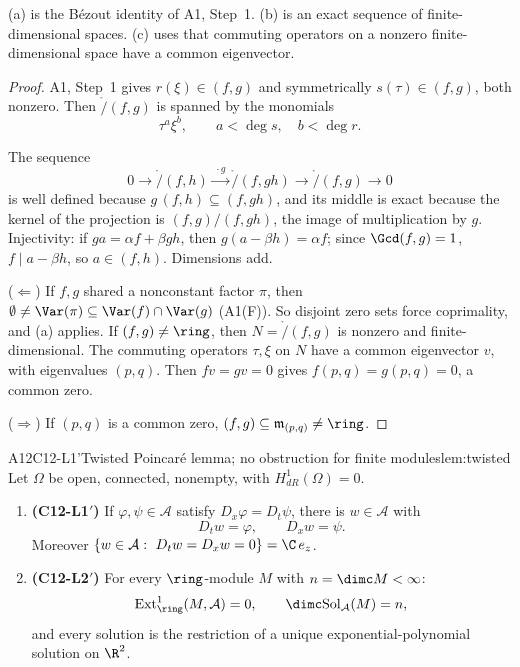 \begin{proofidea}
(a) is the B\'ezout identity of A1, Step~1. (b) is an exact sequence of finite-dimensional spaces. (c) uses that commuting operators on a nonzero finite-dimensional space have a common eigenvector.
\end{proofidea}

\begin{proof}
A1, Step~1 gives $r(\xi)\in(f,g)$ and symmetrically $s(\tau)\in(f,g)$, both nonzero. Then $\ring/(f,g)$ is spanned by the monomials
\[
\tau^a\xi^b,\qquad a<\deg s,\quad b<\deg r .
\]

The sequence
\[
0\to\ring/(f,h)\xrightarrow{\ \cdot g\ }\ring/(f,gh)\to\ring/(f,g)\to0
\]
is well defined because $g\,(f,h)\subseteq(f,gh)$, and its middle is exact because the kernel of the projection is $(f,g)/(f,gh)$, the image of multiplication by $g$. Injectivity: if $ga=\alpha f+\beta gh$, then $g(a-\beta h)=\alpha f$; since $\Gcd(f,g)=1$, $f\mid a-\beta h$, so $a\in(f,h)$. Dimensions add.

($\Leftarrow$) If $f,g$ shared a nonconstant factor $\pi$, then $\emptyset\ne\Var(\pi)\subseteq\Var(f)\cap\Var(g)$ (A1(F)). So disjoint zero sets force coprimality, and (a) applies. If $(f,g)\ne\ring$, then $N=\ring/(f,g)$ is nonzero and finite-dimensional. The commuting operators $\tau,\xi$ on $N$ have a common eigenvector $v$, with eigenvalues $(p,q)$. Then $fv=gv=0$ gives $f(p,q)=g(p,q)=0$, a common zero.

($\Rightarrow$) If $(p,q)$ is a common zero, $(f,g)\subseteq\mathfrak m_{(p,q)}\ne\ring$.

\end{proof}

\begin{dimcard}{A12}{C12-L1'}{Twisted Poincar\'e lemma; no obstruction for finite modules}{\proved}{lem:twisted}
\label{dim:C12-L1p}%
Let $\Omega$ be open, connected, nonempty, with $H^1_{dR}(\Omega)=0$.
\begin{enumerate}[label=(\roman*)]
\item \textbf{(C12-L1$'$)} If $\varphi,\psi\in\mathcal A$ satisfy $D_x\varphi=D_t\psi$, there is $w\in\mathcal A$ with
\[
D_tw=\varphi,\qquad D_xw=\psi .
\]
Moreover $\{w\in\mathcal A:\ D_tw=D_xw=0\}=\C\,e_z$.
\item \textbf{(C12-L2$'$)} For every $\ring$-module $M$ with $n=\dimc M<\infty$:
\[
\mathrm{Ext}^1_\ring(M,\mathcal A)=0,\qquad \dimc\mathrm{Sol}_{\mathcal A}(M)=n,
\]
and every solution is the restriction of a unique exponential-polynomial solution on $\R^2$.
\end{enumerate}
\end{dimcard}

